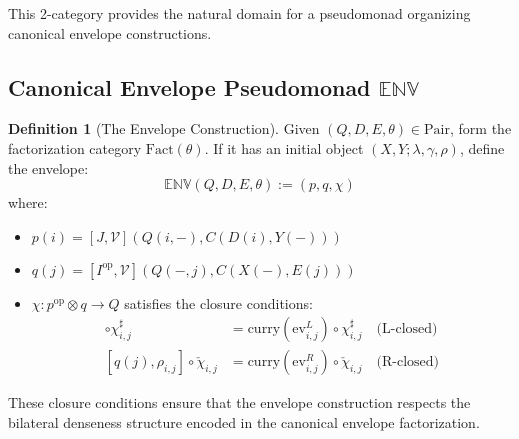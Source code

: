 \documentclass[11pt]{article}
\theoremstyle{plain}
\theoremstyle{definition}
\newtheorem{definition}[theorem]{Definition}
\theoremstyle{remark}
\newcommand{\V}{\mathcal{V}}
\newcommand{\op}{\mathrm{op}}
\newcommand{\Fact}{\mathrm{Fact}}
\newcommand{\Pair}{\mathrm{Pair}}
\begin{document}
\begin{center}
\end{center}

This 2-category provides the natural domain for a pseudomonad organizing canonical envelope constructions.

\subsection{Canonical Envelope Pseudomonad $\mathbb{ENV}$}

\begin{definition}[The Envelope Construction]
Given $(Q, D, E, \theta) \in \Pair$, form the factorization category $\Fact(\theta)$. If it has an initial object $(X, Y; \lambda, \gamma, \rho)$, define the envelope:
$$
\mathbb{ENV}(Q, D, E, \theta) := (p, q, \chi)
$$
where:
\begin{itemize}
\item $p(i) = [J, \V](Q(i, -), C(D(i), Y(-)))$
\item $q(j) = [I^{\op}, \V](Q(-, j), C(X(-), E(j)))$  
\item $\chi : p^{\op} \otimes q \to Q$ satisfies the closure conditions:
\begin{align}
[p(i), \lambda_{i,j}] \circ \chi^{\sharp}_{i,j} &= \mathrm{curry}(\mathrm{ev}^L_{i,j}) \circ \chi^{\sharp}_{i,j} \quad \text{(L-closed)} \\
[q(j), \rho_{i,j}] \circ \check{\chi}_{i,j} &= \mathrm{curry}(\mathrm{ev}^R_{i,j}) \circ \check{\chi}_{i,j} \quad \text{(R-closed)}
\end{align}
\end{itemize}

These closure conditions ensure that the envelope construction respects the bilateral denseness structure encoded in the canonical envelope factorization.
\end{definition}
\end{document}

